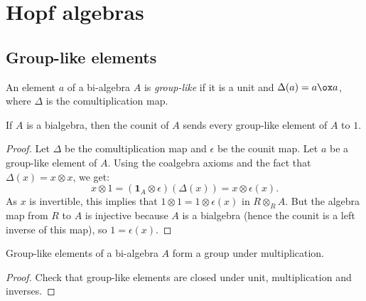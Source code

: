 \section{Hopf algebras}


\subsection{Group-like elements}


\begin{definition}
  \label{0-grp-like}
  \uses{}
  \leanok

  An element $a$ of a bi-algebra $A$ is \emph{group-like} if it is a unit and $\Delta(a) = a \ox a$, where $\Delta$ is the comultiplication map.
\end{definition}

\begin{lemma}
  \label{0-grp-like-counit}
  \leanok

  If $A$ is a bialgebra, then the counit of $A$ sends every group-like element of
  $A$ to $1$.

\end{lemma}

\begin{proof}
  \uses{}
  \leanok 
  
  Let $\Delta$ be the comultiplication map and $\epsilon$ be the counit map.
  Let $a$ be a group-like element of $A$. 
  Using the coalgebra axioms and the fact that $\Delta(x) = x\otimes x$, we get:
  \[x \otimes 1 = (\mathbf{1}_A\otimes\epsilon)(\Delta(x))= x \otimes\epsilon(x).\]
  As $x$ is invertible, this implies that $1\otimes 1 = 1\otimes\epsilon(x)$ in
  $R\otimes_R A$. But the algebra map from $R$ to $A$ is injective because $A$
  is a bialgebra (hence the counit is a left inverse of this map), so $1=\epsilon(x)$.

\end{proof}

\begin{proposition}
  \label{0-grp-like-grp}
  \leanok

  Group-like elements of a bi-algebra $A$ form a group under multiplication.
\end{proposition}
\begin{proof}
  \uses{}
  \leanok

  Check that group-like elements are closed under unit, multiplication and inverses.
\end{proof}


